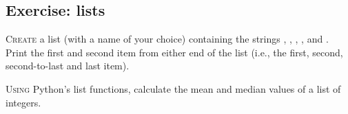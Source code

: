 \subsection{Exercise: lists}

\lettrine{C}{reate} a list (with a name of your choice) containing the strings , , , ,  and . Print the first and second item from either end of the list (i.e., the first, second, second-to-last and last item).

\lettrine{U}{sing} Python's list functions, calculate the mean and median values of a list of integers.